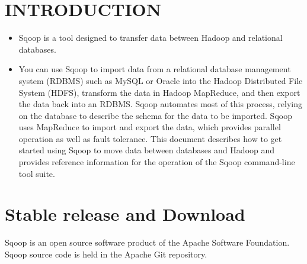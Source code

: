 \documentclass[letterpaper,10pt,english]{sphinxmanual}
\begin{document}
\section{INTRODUCTION}
\label{sqoop:introduction}\begin{itemize}
\item {} 
Sqoop is a tool designed to transfer data between Hadoop and relational databases.

\item {} 
You can use Sqoop to import data from a relational database management system (RDBMS) such as MySQL or Oracle into the Hadoop Distributed File System (HDFS), transform the data in Hadoop MapReduce, and then export the data back into an RDBMS. Sqoop automates most of this process, relying on the database to describe the schema for the data to be imported. Sqoop uses MapReduce to import and export the data, which provides parallel operation as well as fault tolerance. This document describes how to get started using Sqoop to move data between databases and Hadoop and provides reference information for the operation of the Sqoop command-line tool suite.

\end{itemize}
\begin{figure}[htbp]
\centering

\end{figure}


\section{Stable release and Download}
\label{sqoop:stable-release-and-download}
Sqoop is an open source software product of the Apache Software Foundation.
Sqoop source code is held in the Apache Git repository.
\end{document}
